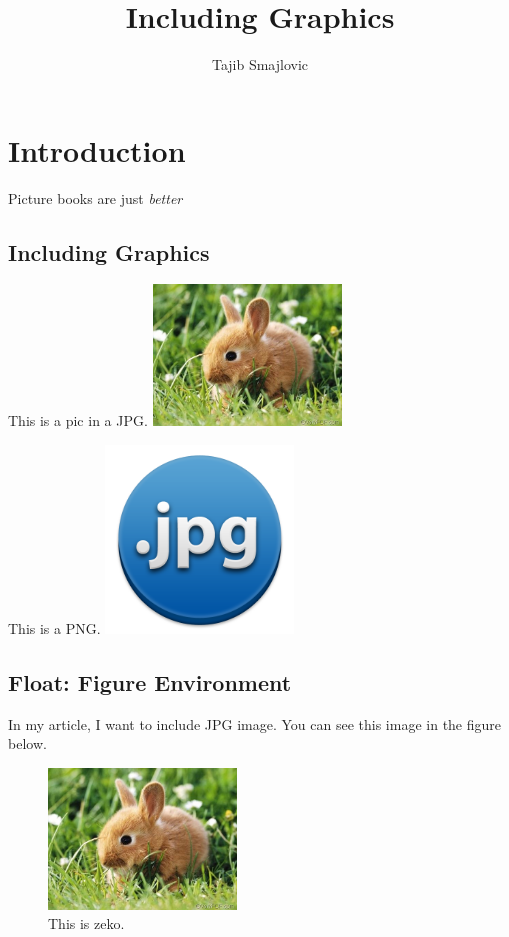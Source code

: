 \documentclass{proc}
\title{Including Graphics}
\author{Tajib Smajlovic}
\date{}
\begin{document}
	
	\maketitle
	
	\section{Introduction}
	Picture books are just \emph{better}
	
	\subsection{Including Graphics}
	This is a pic in a JPG.
	\includegraphics[width=5cm]{zeko.jpg}
	
	This is a PNG.
	\includegraphics[width=5cm]{jpg.png}
	
	\subsection{Float: Figure Environment}
	In my article, I want to include JPG image. You can see this image in the figure below.
	\begin{figure}[htbp]
		\begin{center}
			\includegraphics[width=5cm]{zeko.jpg}
		\end{center}
		\caption{This is zeko.}
		\label{fig:zeko}
	\end{figure}
\end{document}
